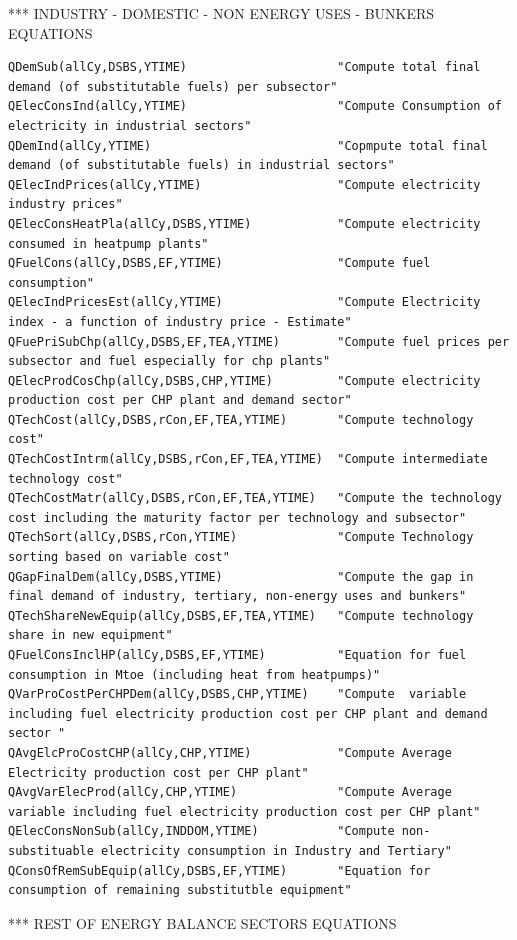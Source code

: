\documentclass[a4paper,]{scrartcl}
\begin{document}
*** INDUSTRY - DOMESTIC - NON ENERGY USES - BUNKERS EQUATIONS

\begin{lstlisting}
QDemSub(allCy,DSBS,YTIME)                     "Compute total final demand (of substitutable fuels) per subsector"
QElecConsInd(allCy,YTIME)                     "Compute Consumption of electricity in industrial sectors"
QDemInd(allCy,YTIME)                          "Copmpute total final demand (of substitutable fuels) in industrial sectors"
QElecIndPrices(allCy,YTIME)                   "Compute electricity industry prices"
QElecConsHeatPla(allCy,DSBS,YTIME)            "Compute electricity consumed in heatpump plants"
QFuelCons(allCy,DSBS,EF,YTIME)                "Compute fuel consumption"
QElecIndPricesEst(allCy,YTIME)                "Compute Electricity index - a function of industry price - Estimate"
QFuePriSubChp(allCy,DSBS,EF,TEA,YTIME)        "Compute fuel prices per subsector and fuel especially for chp plants"
QElecProdCosChp(allCy,DSBS,CHP,YTIME)         "Compute electricity production cost per CHP plant and demand sector"
QTechCost(allCy,DSBS,rCon,EF,TEA,YTIME)       "Compute technology cost"
QTechCostIntrm(allCy,DSBS,rCon,EF,TEA,YTIME)  "Compute intermediate technology cost"
QTechCostMatr(allCy,DSBS,rCon,EF,TEA,YTIME)   "Compute the technology cost including the maturity factor per technology and subsector"
QTechSort(allCy,DSBS,rCon,YTIME)              "Compute Technology sorting based on variable cost"
QGapFinalDem(allCy,DSBS,YTIME)                "Compute the gap in final demand of industry, tertiary, non-energy uses and bunkers"
QTechShareNewEquip(allCy,DSBS,EF,TEA,YTIME)   "Compute technology share in new equipment"
QFuelConsInclHP(allCy,DSBS,EF,YTIME)          "Equation for fuel consumption in Mtoe (including heat from heatpumps)"
QVarProCostPerCHPDem(allCy,DSBS,CHP,YTIME)    "Compute  variable including fuel electricity production cost per CHP plant and demand sector "
QAvgElcProCostCHP(allCy,CHP,YTIME)            "Compute Average Electricity production cost per CHP plant"
QAvgVarElecProd(allCy,CHP,YTIME)              "Compute Average variable including fuel electricity production cost per CHP plant"
QElecConsNonSub(allCy,INDDOM,YTIME)           "Compute non-substituable electricity consumption in Industry and Tertiary"
QConsOfRemSubEquip(allCy,DSBS,EF,YTIME)       "Equation for consumption of remaining substitutble equipment"    
\end{lstlisting}

*** REST OF ENERGY BALANCE SECTORS EQUATIONS
\end{document}
